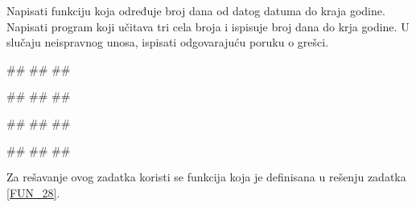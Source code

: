 \begin{Exercise}[label=FUN_27] 
Napisati funkciju  koja određuje broj dana od datog datuma do kraja
godine. Napisati program koji učitava tri cela broja i ispisuje broj
dana do krja godine. 
U slučaju neispravnog unosa, ispisati odgovarajuću poruku o grešci.

\begin{miditest}
\begin{upotreba}{1}
#\naslovInt#
##
##
\end{upotreba}
\end{miditest}
\begin{miditest}
\begin{upotreba}{2}
#\naslovInt#
##
##
\end{upotreba}
\end{miditest}

\begin{miditest}
\begin{upotreba}{3}
#\naslovInt#
##
##
\end{upotreba}
\end{miditest}
\begin{miditest}
\begin{upotreba}{4}
#\naslovInt#
##
##
\end{upotreba}
\end{miditest}

\end{Exercise}
\ifresenja 
\begin{Answer}[ref=FUN_27]

Za rešavanje ovog zadatka koristi se funkcija  koja je definisana u rešenju zadatka \ref{FUN_28}.
\end{Answer} 
\fi

